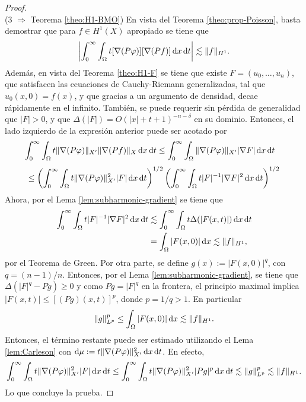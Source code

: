 \begin{proof}
\begin{equation*}
	\end{equation*}
	(3 $\Rightarrow$ Teorema \ref{theo:H1-BMO}) En vista del Teorema \ref{theo:prop-Poisson}, basta demostrar que para $f\in H^1(X)$ apropiado se tiene que
	\begin{equation*}
		\left| \int_0^\infty \int_{\Omega} t[\nabla(P\varphi)][\nabla(Pf)]\mathop{}\!\mathrm{d} x \mathop{}\!\mathrm{d} t
		\right| \lesssim \|f\|_{H^1}.
	\end{equation*}
	Además, en vista del Teorema \ref{theo:H1-F} se tiene que existe $F=(u_0,\ldots, u_n)$, que satisfacen las ecuaciones de Cauchy-Riemann generalizadas, tal que $u_0(x, 0)=f(x)$, y que gracias a un argumento de densidad, decae rápidamente en el infinito. También, se puede requerir sin pérdida de generalidad que $|F|>0$, y que $\Delta(|F|) = O(|x|+t+1)^{-n-\delta}$ en su dominio. Entonces, el lado izquierdo de la expresión anterior puede ser acotado por 
	\begin{align*}
		\int_0^\infty \int_{\Omega} t\|\nabla(P\varphi)\|_{X'}\|\nabla(Pf)\|_X\mathop{}\!\mathrm{d} x \mathop{}\!\mathrm{d} t & \leq\int_0^\infty \int_{\Omega}  \|\nabla(P\varphi)\|_{X'}|\nabla F|\mathop{}\!\mathrm{d} x\mathop{}\!\mathrm{d} t
	\end{align*}
	\begin{equation*}
		\leq \left( \int_0^\infty \int_{\Omega} t\|\nabla(P\varphi)\|_{X'}^2|F| \mathop{}\!\mathrm{d} x \mathop{}\!\mathrm{d} t
		\right)^{1/2}\left(\int_0^\infty \int_{\Omega}  t|F|^{-1}|\nabla F|^2 \mathop{}\!\mathrm{d} x \mathop{}\!\mathrm{d} t
		\right)^{1/2}
	\end{equation*}
	Ahora, por el Lema \ref{lem:subharmonic-gradient} se tiene que
	\begin{align*}
		\int_0^\infty\int_{\Omega} t|F|^{-1}|\nabla F|^2 \mathop{}\!\mathrm{d} x \mathop{}\!\mathrm{d} t & \lesssim
		\int_0^\infty\int_{\Omega} t\Delta(|F(x, t)|) \mathop{}\!\mathrm{d} x \mathop{}\!\mathrm{d} t \\
		& = \int_{\Omega} |F(x, 0)| \mathop{}\!\mathrm{d} x \lesssim \|f\|_{H^1},
	\end{align*}
	por el Teorema de Green. Por otra parte, se define $g(x):=|F(x, 0)|^q$, con $q=(n-1)/n$. Entonces, por el Lema \ref{lem:subharmonic-gradient}, se tiene que $\Delta(|F|^q - Pg)\geq 0$ y como $Pg = |F|^q$ en la frontera, el principio maximal implica $|F(x, t)| \leq [(Pg)(x, t)]^p$, donde $p=1/q>1$. En particular
	\begin{equation*}
		\|g\|_{L^p}^p \leq \int_{\Omega}|F(x, 0)|\mathop{}\!\mathrm{d} x \lesssim \|f\|_{H^1}.
	\end{equation*}
	Entonces, el término restante puede ser estimado utilizando el Lema  \ref{lem:Carleson} con $\mathop{}\!\mathrm{d}\mu := t\|\nabla(P\varphi)\|_{X'}^2 \mathop{}\!\mathrm{d} x \mathop{}\!\mathrm{d} t$. En efecto,
	\begin{equation*}
		\int_0^\infty \int_{\Omega} t\|\nabla(P\varphi)\|_{X'}^2|F| \mathop{}\!\mathrm{d} x \mathop{}\!\mathrm{d} t \leq \int_0^\infty \int_{\Omega} t\|\nabla(P\varphi)\|_{X'}^2|Pg|^p \mathop{}\!\mathrm{d} x \mathop{}\!\mathrm{d} t \lesssim \|g\|_{L^p}^p \lesssim \|f\|_{H^1}.
	\end{equation*}
	Lo que concluye la prueba.
\end{proof} 
